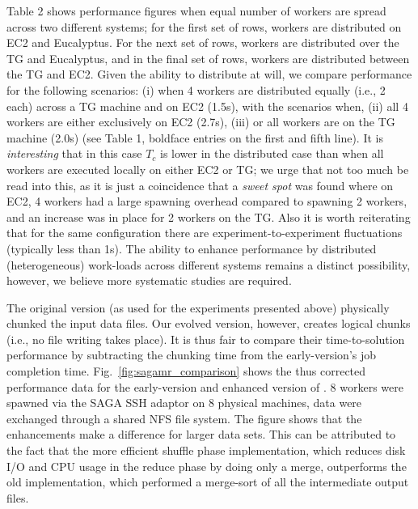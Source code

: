 \documentclass[3p,twocolumn]{elsarticle}
\begin{document}
Table 2 shows performance figures when equal number of workers are
spread across two different systems; for the first set of rows,
workers are distributed on EC2 and Eucalyptus. For the next set of
rows, workers are distributed over the TG and Eucalyptus, and in the
final set of rows, workers are distributed between the TG and EC2.
Given the ability to distribute at will, we compare performance for
the following scenarios: (i) when 4 workers are distributed equally
(i.e., 2 each) across a TG machine and on EC2 (1.5s), with the
scenarios when, (ii) all 4 workers are either exclusively on EC2
(2.7s), (iii) or all workers are on the TG machine (2.0s) (see Table
1, boldface entries on the first and fifth line). It is {\it
  interesting} that in this case $T_c$ is lower in the distributed
case than when all workers are executed locally on either EC2 or TG;
we urge that not too much be read into this, as it is just a
coincidence that a {\it sweet spot} was found where on EC2, 4 workers
had a large spawning overhead compared to spawning 2 workers, and an
increase was in place for 2 workers on the TG. Also it is worth
reiterating that for the same configuration there are
experiment-to-experiment fluctuations (typically less than 1s).  The
ability to enhance performance by distributed (heterogeneous)
work-loads across different systems remains a distinct possibility,
however, we believe more systematic studies are required.



The original \sagamapreduce version (as used for the experiments
presented above) physically chunked the input data files.  Our evolved
version, however, creates logical chunks (i.e., no file
writing takes place).  It is thus fair to compare their
time-to-solution performance by subtracting the chunking time from the
early-version's job completion time.  Fig.~\ref{fig:sagamr_comparison}
shows the thus corrected performance data for the early-version and
enhanced version of \sagamapreduce.  8 workers were spawned via the
SAGA SSH adaptor on 8 physical machines,  data were exchanged through
a shared NFS file system.  The figure shows that the \sagamapreduce
enhancements make a difference for larger data sets.  This can be
attributed to the fact that the more efficient shuffle phase
implementation, which reduces disk I/O and CPU usage in the reduce
phase by doing only a merge, outperforms the old implementation, which
performed a merge-sort of all the intermediate output files.
\end{document}
